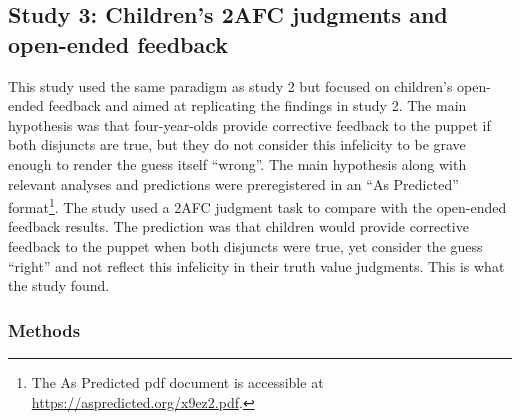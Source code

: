 \documentclass[man]{apa6}
\theoremstyle{definition}
\theoremstyle{definition}
\theoremstyle{definition}
\theoremstyle{remark}
\begin{document}
\subsection{Study 3: Children's 2AFC judgments and open-ended
feedback}\label{study-3-childrens-2afc-judgments-and-open-ended-feedback}

This study used the same paradigm as study 2 but focused on children's
open-ended feedback and aimed at replicating the findings in study 2.
The main hypothesis was that four-year-olds provide corrective feedback
to the puppet if both disjuncts are true, but they do not consider this
infelicity to be grave enough to render the guess itself
\enquote{wrong}. The main hypothesis along with relevant analyses and
predictions were preregistered in an \enquote{As Predicted}
format\footnote{The As Predicted pdf document is accessible at
  \url{https://aspredicted.org/x9ez2.pdf}.}. The study used a 2AFC
judgment task to compare with the open-ended feedback results. The
prediction was that children would provide corrective feedback to the
puppet when both disjuncts were true, yet consider the guess
\enquote{right} and not reflect this infelicity in their truth value
judgments. This is what the study found.

\subsubsection{Methods}\label{methods-2}
\end{document}
